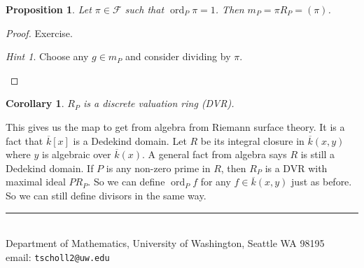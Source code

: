 \documentclass[11pt]{article}
\makeatletter
\newcommand{\script}[1]{\mathcal{#1}} %
\newcommand{\sF}{\script{F}}
\newcommand{\ord}{\operatorname{ord}}
\theoremstyle{plain}
\newtheorem{prop}[propositionCounter]{Proposition}
\newtheorem{cor}[corollaryCounter]{Corollary}
\theoremstyle{definition}
\theoremstyle{remark}
\newtheorem*{hint}{Hint}
\newcommand{\myauthor}{Travis Scholl}
\newcommand{\myemail}{tscholl2@uw.edu}
\makeatother
\begin{document}
\begin{prop}
	Let $\pi\in\sF$ such that $\ord_P\pi = 1$. Then $m_P = \pi R_P = (\pi)$.
\end{prop}
\begin{proof}
	Exercise.
	\begin{hint}
		Choose any $g\in m_P$ and consider dividing by $\pi$.
	\end{hint}
\end{proof}

\begin{cor}
	$R_P$ is a discrete valuation ring (DVR).
\end{cor}

This gives us the map to get from algebra from Riemann surface theory. It is a fact that $\overline{k}[x]$ is a Dedekind domain. Let $R$ be its integral closure in $\overline{k}(x,y)$ where $y$ is algebraic over $\overline{k}(x)$. A general fact from algebra says $R$ is still a Dedekind domain. If $P$ is any non-zero prime in $R$, then $R_P$ is a DVR with maximal ideal $PR_P$. So we can define $\ord_P f$ for any $f\in \overline{k}(x,y)$ just as before. So we can still define divisors in the same way.





\begin{center}
\noindent\rule{4cm}{.5pt}
\vspace{.25cm}

\noindent {\sc \small \myauthor}\\
{\small Department of Mathematics, University of Washington, Seattle WA 98195} \\
email: {\tt \myemail}
\end{center}
\end{document}
